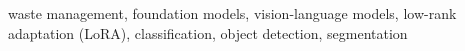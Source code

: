 \documentclass[conference]{IEEEtran}
\begin{document}
\begin{IEEEkeywords}
\normalfont
waste management, foundation models, vision-language models, low-rank adaptation
(LoRA), classification, object detection, segmentation
\end{IEEEkeywords}




\end{document}
